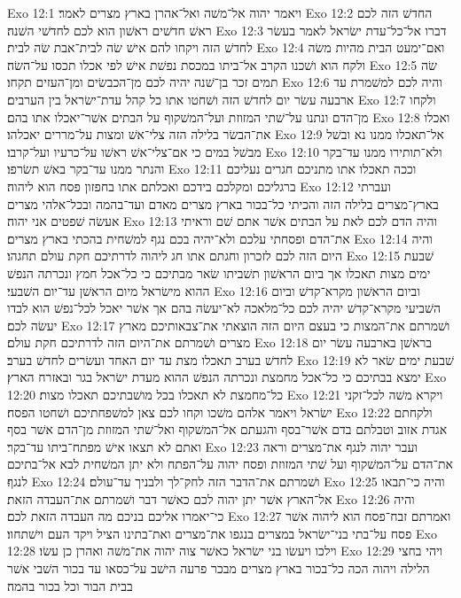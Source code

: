Exo 12:1  ויאמר יהוה אל־משׁה ואל־אהרן בארץ מצרים לאמר׃
Exo 12:2  החדשׁ הזה לכם ראשׁ חדשׁים ראשׁון הוא לכם לחדשׁי השׁנה׃
Exo 12:3  דברו אל־כל־עדת ישׂראל לאמר בעשׂר לחדשׁ הזה ויקחו להם אישׁ שׂה לבית־אבת שׂה לבית׃
Exo 12:4  ואם־ימעט הבית מהיות משׂה ולקח הוא ושׁכנו הקרב אל־ביתו במכסת נפשׁת אישׁ לפי אכלו תכסו על־השׂה׃
Exo 12:5  שׂה תמים זכר בן־שׁנה יהיה לכם מן־הכבשׂים ומן־העזים תקחו׃
Exo 12:6  והיה לכם למשׁמרת עד ארבעה עשׂר יום לחדשׁ הזה ושׁחטו אתו כל קהל עדת־ישׂראל בין הערבים׃
Exo 12:7  ולקחו מן־הדם ונתנו על־שׁתי המזוזת ועל־המשׁקוף על הבתים אשׁר־יאכלו אתו בהם׃
Exo 12:8  ואכלו את־הבשׂר בלילה הזה צלי־אשׁ ומצות על־מררים יאכלהו׃
Exo 12:9  אל־תאכלו ממנו נא ובשׁל מבשׁל במים כי אם־צלי־אשׁ ראשׁו על־כרעיו ועל־קרבו׃
Exo 12:10  ולא־תותירו ממנו עד־בקר והנתר ממנו עד־בקר באשׁ תשׂרפו׃
Exo 12:11  וככה תאכלו אתו מתניכם חגרים נעליכם ברגליכם ומקלכם בידכם ואכלתם אתו בחפזון פסח הוא ליהוה׃
Exo 12:12  ועברתי בארץ־מצרים בלילה הזה והכיתי כל־בכור בארץ מצרים מאדם ועד־בהמה ובכל־אלהי מצרים אעשׂה שׁפטים אני יהוה׃
Exo 12:13  והיה הדם לכם לאת על הבתים אשׁר אתם שׁם וראיתי את־הדם ופסחתי עלכם ולא־יהיה בכם נגף למשׁחית בהכתי בארץ מצרים׃
Exo 12:14  והיה היום הזה לכם לזכרון וחגתם אתו חג ליהוה לדרתיכם חקת עולם תחגהו׃
Exo 12:15  שׁבעת ימים מצות תאכלו אך ביום הראשׁון תשׁביתו שׂאר מבתיכם כי כל־אכל חמץ ונכרתה הנפשׁ ההוא מישׂראל מיום הראשׁן עד־יום השׁבעי׃
Exo 12:16  וביום הראשׁון מקרא־קדשׁ וביום השׁביעי מקרא־קדשׁ יהיה לכם כל־מלאכה לא־יעשׂה בהם אך אשׁר יאכל לכל־נפשׁ הוא לבדו יעשׂה לכם׃
Exo 12:17  ושׁמרתם את־המצות כי בעצם היום הזה הוצאתי את־צבאותיכם מארץ מצרים ושׁמרתם את־היום הזה לדרתיכם חקת עולם׃
Exo 12:18  בראשׁן בארבעה עשׂר יום לחדשׁ בערב תאכלו מצת עד יום האחד ועשׂרים לחדשׁ בערב׃
Exo 12:19  שׁבעת ימים שׂאר לא ימצא בבתיכם כי כל־אכל מחמצת ונכרתה הנפשׁ ההוא מעדת ישׂראל בגר ובאזרח הארץ׃
Exo 12:20  כל־מחמצת לא תאכלו בכל מושׁבתיכם תאכלו מצות׃
Exo 12:21  ויקרא משׁה לכל־זקני ישׂראל ויאמר אלהם משׁכו וקחו לכם צאן למשׁפחתיכם ושׁחטו הפסח׃
Exo 12:22  ולקחתם אגדת אזוב וטבלתם בדם אשׁר־בסף והגעתם אל־המשׁקוף ואל־שׁתי המזוזת מן־הדם אשׁר בסף ואתם לא תצאו אישׁ מפתח־ביתו עד־בקר׃
Exo 12:23  ועבר יהוה לנגף את־מצרים וראה את־הדם על־המשׁקוף ועל שׁתי המזוזת ופסח יהוה על־הפתח ולא יתן המשׁחית לבא אל־בתיכם לנגף׃
Exo 12:24  ושׁמרתם את־הדבר הזה לחק־לך ולבניך עד־עולם׃
Exo 12:25  והיה כי־תבאו אל־הארץ אשׁר יתן יהוה לכם כאשׁר דבר ושׁמרתם את־העבדה הזאת׃
Exo 12:26  והיה כי־יאמרו אליכם בניכם מה העבדה הזאת לכם׃
Exo 12:27  ואמרתם זבח־פסח הוא ליהוה אשׁר פסח על־בתי בני־ישׂראל במצרים בנגפו את־מצרים ואת־בתינו הציל ויקד העם וישׁתחוו׃
Exo 12:28  וילכו ויעשׂו בני ישׂראל כאשׁר צוה יהוה את־משׁה ואהרן כן עשׂו׃
Exo 12:29  ויהי בחצי הלילה ויהוה הכה כל־בכור בארץ מצרים מבכר פרעה הישׁב על־כסאו עד בכור השׁבי אשׁר בבית הבור וכל בכור בהמה׃
